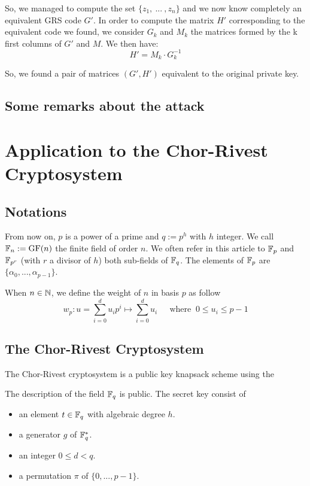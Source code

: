 \documentclass[a4paper]{article}
\newcommand{\GF}[1]{\F_{#1}}
\begin{document}
So, we managed to compute the set $\{ z_1, \ ... \ ,z_n \}$ and we now know completely an equivalent GRS code $G'$. In order to compute the matrix $H'$ corresponding to the equivalent code we found, we consider
$G_{k}$ and $M_{k}$ the matrices formed by the k first columns of $G'$ and $M$. We then have:
$$H' = M_{k}\cdot G_{k}^{-1}$$

So, we found a pair of matrices $(G',H')$ equivalent to the original private key.

\subsection{Some remarks about the attack}




\newpage
\section{Application to the Chor-Rivest Cryptosystem}
\label{sec:CRcrypt}

\subsection{Notations}

From now on, $p$ is a power of a prime and $q := p^h$ with $h$ integer. We call $\mathbb{F}_n := \text{GF}(n)$ the finite field of order $n$. We often refer in this article to $\mathbb{F}_p$ and $\mathbb{F}_{p^r}$ (with $r$ a divisor of $h$) both sub-fields of $\mathbb{F}_q$. The elements of $\mathbb{F}_p$ are $\{ \alpha_0, ... , \alpha_{p-1} \}$.

When $n \in \mathbb{N}$, we define the weight of $n$ in basis $p$ as follow
$$ w_p : u = \sum_{i=0}^{d} u_i p^i \longmapsto \sum_{i=0}^{d} u_i \ \ \ \ \ \text{ where }  \ 0 \leq u_i \leq p-1 $$

\subsection{The Chor-Rivest Cryptosystem}

The Chor-Rivest cryptosystem is a public key knapsack scheme using the 


The description of the field $\mathbb{F}_q$ is public. The secret key consist of
\begin{itemize}
\item an element $t \in \GF{q}$ with algebraic degree $h$.
\item a generator $g$ of $\GF{q}^{*}$.
\item an integer $0 \leq d < q$.
\item a permutation $\pi$ of $\{ 0, ... , p-1 \}$.
\end{itemize}
\end{document}
